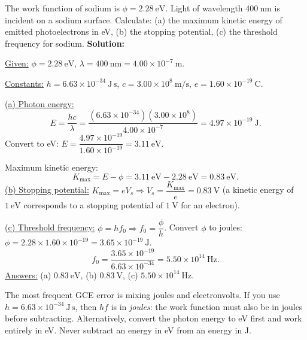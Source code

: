\documentclass[11pt]{article}
\begin{document}
\begin{exoresolu}
The work function of sodium is $\phi = 2.28\ \mathrm{eV}$. Light of wavelength $400\ \mathrm{nm}$ is incident on a sodium surface. Calculate: (a) the maximum kinetic energy of emitted photoelectrons in eV, (b) the stopping potential, (c) the threshold frequency for sodium.
\tcblower
\textbf{Solution:}\par
\underline{Given:} $\phi = 2.28\ \mathrm{eV}$, $\lambda = 400\ \mathrm{nm} = 4.00\times10^{-7}\ \mathrm{m}$.\par
\underline{Constants:} $h = 6.63\times10^{-34}\ \mathrm{J\,s}$, $c = 3.00\times10^8\ \mathrm{m/s}$, $e = 1.60\times10^{-19}\ \mathrm{C}$.\par
\underline{(a) Photon energy:}
\[
E = \frac{hc}{\lambda} = \frac{(6.63\times10^{-34})(3.00\times10^8)}{4.00\times10^{-7}} = 4.97\times10^{-19}\ \mathrm{J}.
\]
Convert to eV: $E = \dfrac{4.97\times10^{-19}}{1.60\times10^{-19}} = 3.11\ \mathrm{eV}$.\par
Maximum kinetic energy:
\[
K_{\max} = E - \phi = 3.11\ \mathrm{eV} - 2.28\ \mathrm{eV} = 0.83\ \mathrm{eV}.
\]
\underline{(b) Stopping potential:} $K_{\max} = eV_s \Rightarrow V_s = \dfrac{K_{\max}}{e} = 0.83\ \mathrm{V}$ (a kinetic energy of $1\ \mathrm{eV}$ corresponds to a stopping potential of $1\ \mathrm{V}$ for an electron).\par
\underline{(c) Threshold frequency:} $\phi = hf_0 \Rightarrow f_0 = \dfrac{\phi}{h}$.
Convert $\phi$ to joules: $\phi = 2.28 \times 1.60\times10^{-19} = 3.65\times10^{-19}\ \mathrm{J}$.
\[
f_0 = \frac{3.65\times10^{-19}}{6.63\times10^{-34}} = 5.50\times10^{14}\ \mathrm{Hz}.
\]
\underline{Answers:} (a) $0.83\ \mathrm{eV}$, (b) $0.83\ \mathrm{V}$, (c) $5.50\times10^{14}\ \mathrm{Hz}$.
\end{exoresolu}

\begin{attention}
The most frequent GCE error is mixing joules and electronvolts. If you use $h = 6.63\times10^{-34}\ \mathrm{J\,s}$, then $hf$ is in \emph{joules}: the work function must also be in joules before subtracting. Alternatively, convert the photon energy to eV first and work entirely in eV. Never subtract an energy in eV from an energy in J.
\end{attention}
\end{document}
